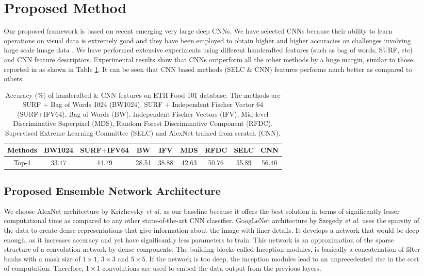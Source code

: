 \documentclass[journal]{IEEEtran}%
\begin{document}
\section{Proposed Method}
Our proposed framework is based on recent emerging very large deep CNNs. We have selected CNNs because their ability to learn operations on visual data is extremely good and they have been employed to obtain higher and higher accuracies on challenges involving large scale image data \cite{Olga1}. We have performed extensive experiments using different handcrafted features (such as bag of words, SURF, etc) and CNN feature descriptors. Experimental results show that CNNs outperform all the other methods by a huge margin, similar to those reported in \cite{Martinel1} as shown in Table \ref{Table1}. It can be seen that CNN based methods (SELC \& CNN) features performs much better as compared to others.
\begin{table}[!htb] \tiny
      \centering
        \caption{\tiny Accuracy (\%) of handcrafted \& CNN features on ETH Food-101 database. The methods are SURF + Bag of Words 1024 (BW1024), SURF + Independent Fischer Vector 64 (SURF+IFV64), Bag of Words (BW), Independent Fischer Vectors (IFV), Mid-level Discriminative Superpixel (MDS), Random Forest Discriminative Component (RFDC), Supervised Extreme Learning Committee (SELC) and AlexNet trained from scratch (CNN).} \label{Table1}
        \begin{tabular}{|c|c|c|c|c|c|c|c|c|}
        \hline
        Methods & BW1024 & SURF+IFV64 & BW & IFV & MDS & RFDC & SELC & CNN\\
        \hline
        Top-1 & 33.47 & 44.79 & 28.51 & 38.88 & 42.63 & 50.76 & 55.89 & 56.40\\
        \hline
        \end{tabular}
\end{table}


\subsection{Proposed Ensemble Network Architecture}
We choose AlexNet architecture by Krizhevsky \emph{et al.} \cite{Krizhevsky1} as our baseline because it offers the best solution in terms of significantly lesser computational time as compared to any other state-of-the-art CNN classifier. GoogLeNet architecture by Szegedy \emph{et al.} \cite{Christian1} uses the sparsity of the data to create dense representations that give information about the image with finer details. It develops a network that would be deep enough, as it increases accuracy and yet have significantly less parameters to train. This network is an approximation of the sparse structure of a convolution network by dense components. The building blocks called Inception modules, is basically a concatenation of filter banks with a mask size of $1\times1$, $3\times3$ and $5\times5$. If the network is too deep, the inception modules lead to an unprecedented rise in the cost of computation. Therefore, $1\times1$ convolutions are used to embed the data output from the previous layers.
\end{document}
